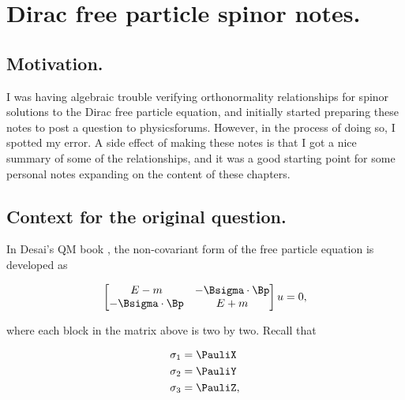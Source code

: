 
%

\chapter{Dirac free particle spinor notes.}
\label{chap:desaiDiracAdjoint}
{}
\date{May 25, 2011}

\beginArtWithToc

\section{Motivation.}

I was having algebraic trouble verifying orthonormality relationships for spinor solutions to the Dirac free particle equation, and initially started preparing these notes to post a question to physicsforums.  However, in the process of doing so, I spotted my error.  A side effect of making these notes is that I got a nice summary of some of the relationships, and it was a good starting point for some personal notes expanding on the content of these chapters.

\section{Context for the original question.}

In Desai's QM book \cite{desai2009quantum}, the non-covariant form of the free particle equation is developed as

\begin{equation}\label{eqn:desaiDiracAdjoint:10}
\begin{bmatrix}
E - m & - \Bsigma \cdot \Bp \\
- \Bsigma \cdot \Bp & E + m
\end{bmatrix}
u
= 0,
\end{equation}

where each block in the matrix above is two by two.  Recall that

\begin{subequations}
\begin{align}\label{eqn:desaiDiracAdjoint:200}
\sigma_1 &= \PauliX \\
\sigma_2 &= \PauliY \\
\sigma_3 &= \PauliZ,
\end{align}
\end{subequations}

